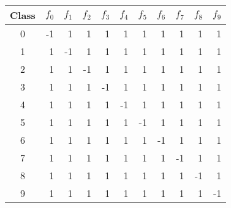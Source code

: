 \begin{tabular}{|c|r|r|r|r|r|r|r|r|r|r|}
	\hline
	Class	& $f_0$ & $f_1$ & $f_2$ & $f_3$ & $f_4$ & $f_5$ & $f_6$ & $f_7$ & $f_8$ & $f_9$ \\ \hline \hline
	0	& -1 &  1 &  1 &  1 &  1 &  1 &  1 &  1 &  1 &  1 \\ \hline
	1	&  1 & -1 &  1 &  1 &  1 &  1 &  1 &  1 &  1 &  1 \\ \hline
	2	&  1 &  1 & -1 &  1 &  1 &  1 &  1 &  1 &  1 &  1 \\ \hline
	3	&  1 &  1 &  1 & -1 &  1 &  1 &  1 &  1 &  1 &  1 \\ \hline
	4	&  1 &  1 &  1 &  1 & -1 &  1 &  1 &  1 &  1 &  1 \\ \hline
	5	&  1 &  1 &  1 &  1 &  1 & -1 &  1 &  1 &  1 &  1 \\ \hline
	6	&  1 &  1 &  1 &  1 &  1 &  1 & -1 &  1 &  1 &  1 \\ \hline
	7	&  1 &  1 &  1 &  1 &  1 &  1 &  1 & -1 &  1 &  1 \\ \hline
	8	&  1 &  1 &  1 &  1 &  1 &  1 &  1 &  1 & -1 &  1 \\ \hline
	9	&  1 &  1 &  1 &  1 &  1 &  1 &  1 &  1 &  1 & -1 \\ \hline
\end{tabular}